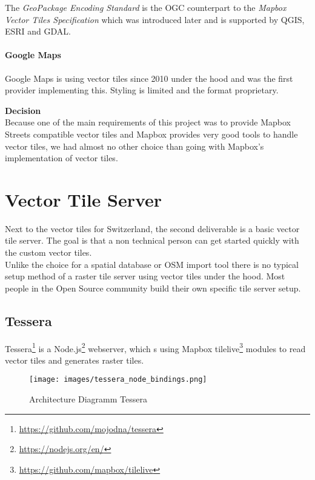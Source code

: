 The \emph{GeoPackage Encoding Standard} is the OGC counterpart to the
\emph{Mapbox Vector Tiles Specification} which was introduced later and
is supported by QGIS, ESRI and GDAL.

\paragraph{Google Maps}

Google Maps is using vector tiles since 2010 under the hood and was the
first provider implementing this. Styling is limited and the format
proprietary.

\begin{tcolorbox}
\textbf{Decision} \\
Because one of the main requirements of this project was to provide Mapbox Streets compatible vector tiles and Mapbox provides very good tools to handle vector tiles, we had almost no other choice than going with Mapbox's implementation of vector tiles.
\end{tcolorbox}

\section{Vector Tile Server}\label{vector_tile_server}

Next to the vector tiles for Switzerland, the second deliverable is a basic vector tile server. The goal is that a non technical person can get started quickly with the custom vector tiles.\\

Unlike the choice for a spatial database or OSM import tool
there is no typical setup method of a raster tile server using vector tiles under the hood. Most people in the Open Source community build their own specific tile server setup.

\subsection{Tessera}\label{tessera}

Tessera\footnote{\url{https://github.com/mojodna/tessera}} is a Node.js\footnote{\url{https://nodejs.org/en/}} webserver, which s using Mapbox tilelive\footnote{\url{https://github.com/mapbox/tilelive}} modules to read vector tiles and generates raster tiles.

\begin{figure}[H]
  \texttt{[image: images/tessera\_node\_bindings.png]}
  \caption{Architecture Diagramm Tessera}
\end{figure}

